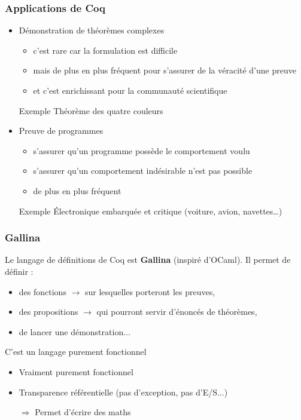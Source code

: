 \documentclass[9pt,handout]{beamer}
\newenvironment{ex}[1][Exemple]{\begin{exampleblock}{#1}}{\end{exampleblock}}
\begin{document}
\begin{frame}
\frametitle{Applications de Coq}

\begin{itemize}
 \item Démonstration de théorèmes complexes
\begin{itemize}
  \item c'est rare car la formulation est difficile
  \item mais de plus en plus fréquent pour s'assurer de la véracité d'une preuve
  \item et c'est enrichissant pour la communauté scientifique
\end{itemize}

\begin{ex}
Théorème des quatre couleurs
\end{ex}

\bigskip
\pause
 \item Preuve de programmes
\begin{itemize}
  \item s'assurer qu'un programme possède le comportement voulu
  \item s'assurer qu'un comportement indésirable n'est pas possible
  \item de plus en plus fréquent
\end{itemize}
\begin{ex}
Électronique embarquée et critique (voiture, avion, navettes…)
\end{ex}

\end{itemize}

\end{frame}



\begin{frame}
\frametitle{Gallina}

Le langage de définitions de Coq est \textbf{Gallina} (inspiré d'OCaml). Il permet de définir :
\begin{itemize}
  \item des fonctions $\rightarrow$ sur lesquelles porteront les preuves,
  \item des propositions $\rightarrow$ qui pourront servir d'énoncés de théorèmes,
  \item de lancer une démonstration...
\end{itemize}

\pause
\medskip
C'est un langage purement fonctionnel
\begin{itemize}
  \item Vraiment purement fonctionnel
  \item Transparence référentielle (pas d'exception, pas d'E/S...)
  \item[$\Rightarrow$] Permet d'écrire des maths
\end{itemize}

\end{frame}
\end{document}
